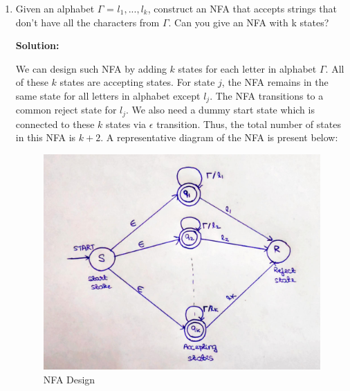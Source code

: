 \documentclass[11pt]{article}
\begin{document}

\title{}
\author{}
\date{}

\maketitle

\begin{enumerate}[1.]
    \item Given an alphabet $\Gamma$ = ${l_1,...,l_k}$, construct an NFA that accepts strings that don’t have all the characters from $\Gamma$. Can you give an NFA with k states?

    \textbf{Solution:}
    
    We can design such NFA by adding $k$ states for each letter in alphabet $\Gamma$. All of these $k$ states are accepting states. For state $j$, the NFA remains in the same state for all letters in alphabet except $l_j$. The NFA transitions to a common reject state for $l_j$. We also need a dummy start state which is connected to these $k$ states via $\epsilon$ transition. Thus, the total number of states in this NFA is $k+2$. A representative diagram of the NFA is present below:
    \begin{figure}[!htb]%
    \centering
    \includegraphics[width=0.7\linewidth]{nfa.jpg}%
    \caption{NFA Design}
    \label{p6}
    \end{figure}
    

\end{enumerate}
\end{document}
